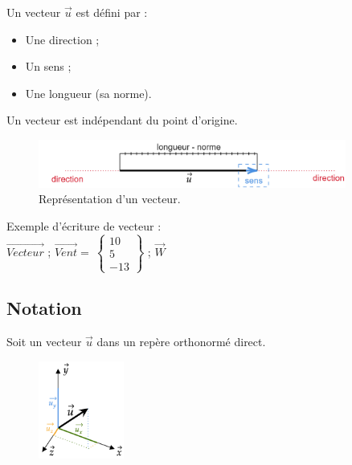 \documentclass[
	11pt, %
	fleqn, %
	a4paper, %
]{LegrandOrangeBook}
\begin{document}
\begin{definition}\label{Vecteurs}
    Un vecteur $\Vec{u}$ est défini par :
    \begin{itemize}
        \item Une direction ;
        \item Un sens ;
        \item Une longueur (sa norme).
    \end{itemize}
Un vecteur est indépendant du point d’origine.

\begin{figure}[H] %
	\centering %
	\includegraphics[width=0.9\textwidth]{Images/reel2.png} %
	\caption{Représentation d'un vecteur.}
	\label{vecteur} %
\end{figure}

\end{definition}

Exemple d'écriture de vecteur : \\
$\overrightarrow{Vecteur}$ ;  $\overrightarrow{Vent}=\ \begin{Bmatrix} 10\\ 5 \\ -13 \end{Bmatrix} $ ; $\overrightarrow{W}$


\subsection{Notation}
Soit un vecteur $\Vec{u}$ dans un repère orthonormé direct.


\begin{figure} %
    \centering
    \includegraphics[width=0.25\textwidth]{Images/not1.png}
\end{figure}
\end{document}
